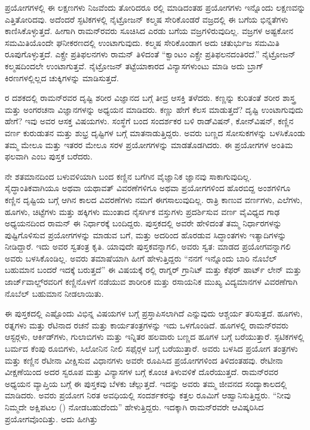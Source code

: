 ಪ್ರಯೋಗಗಳಲ್ಲಿ ಈ ಲಕ್ಷಣಗಳು ನಿಜವೆಂದು ತೋರಿದರೂ ರಲ್ಲಿ ಮಾಡಿದಂತಹ ಪ್ರಯೋಗಗಳು ಇನ್ನೊಂದು ಲಕ್ಷಣವನ್ನು ಎತ್ತಿತೋರಿದವು. ಅದೆಂದರೆ ಸ್ಫಟಿಕಗಳಲ್ಲಿ ನೈಟ್ರೋಜನ್ ಕಲ್ಮಷ ಸೇರಿಕೊಂಡರೆ ವಜ್ರದಲ್ಲಿ ಈ ಬಗೆಯ ಭಿನ್ನತೆಗಳು ಕಾಣಿಸಿಕೊಳ್ಳುತ್ತದೆ. ಹೀಗಾಗಿ ರಾಮನ್‍ರವರು ಸೂಚಿಸಿದ ಎರಡು ಬಗೆಯ ವಜ್ರಗಳಿರುವುದಿಲ್ಲ. ವಜ್ರಗಳ ಅಷ್ಟಕೋನ ಸಮಮಿತಿಯೊಂದೇ ಘನೀಕರಣದಲ್ಲಿ ಉಂಟಾಗುವುದು. ಕಲ್ಮಷ ಸೇರಿಕೊಂಡಾಗ ಅದು ಚತುರ್ಭುಜ ಸಮಮಿತಿ ರೂಪುಗೊಳ್ಳುತ್ತದೆ. ಎಕ್ಸ್\enginline{-}ರೇ ಪ್ರತಿಫಲನಗಳು ರಾಮನ್ ತಿಳಿದಂತೆ “ಕ್ವಾಂಟಂ ಎಕ್ಸ್\enginline{-}ರೇ ಪ್ರತಿಫಲನದಂತಿರದೆ.” ನೈಟ್ರೋಜನ್ ಕಲ್ಮಷದಿಂದಲೇ ಉಂಟಾಗುತ್ತವೆ. ನೈಟ್ರೋಜನ್ ತಟ್ಟೆಯಾಕಾರದ ವಿನ್ಯಾಸಗಳುಂಟು ಮಾಡಿ ಅದು ಬ್ರಾಗ್ ಕಿರಣಗಳಲ್ಲಿಲ್ಲದ ಚುಕ್ಕಿಗಳನ್ನು ಮಾಡಿಸುತ್ತದೆ.



ರ ದಶಕದಲ್ಲಿ ರಾಮನ್‍ರವರ ದೃಷ್ಟಿ ಶರೀರ ವಿಜ್ಞಾನದ ಬಗ್ಗೆ ತೀವ್ರ ಆಸಕ್ತಿ ತಳೆದರು. ಕಣ್ಣನ್ನು ಕುರಿತಂತೆ ಶರೀರ ಶಾಸ್ತ್ರ ಮತ್ತು ಅಂಗರಚನಾ ವಿಜ್ಞಾನಗಳನ್ನು ಅಧ್ಯಯನ ಮಾಡಿದರು. ಕಣ್ಣು ಹೇಗೆ ಕೆಲಸ ಮಾಡುತ್ತದೆ? ದೃಷ್ಟಿ ಉಂಟಾಗುವುದು ಹೇಗೆ? ಇವು ಅವರ ಆಸಕ್ತ ವಿಷಯಗಳು. ಸಂಸ್ಥೆಗೆ ಬಂದ ಸಂದರ್ಶಕರ ಬಳಿ ರಾಡ್‍ವಿಷನ್, ಕೋನ್‍ವಿಷನ್, ಕಣ್ಣಿನ ವರ್ಣ ಕುರುಡುತನ ಮತ್ತು ಶುಭ್ರ ದೃಷ್ಟಿಗಳ ಬಗ್ಗೆ ಮಾತನಾಡುತ್ತಿದ್ದರು. ಅವರು ಬಣ್ಣದ ಸೋಸುಕಗಳನ್ನು ಬಳಸಿಕೊಂಡು ತಮ್ಮ ಮೇಲೂ ಮತ್ತು ಇತರರ ಮೇಲೂ ಸರಳ ಪ್ರಯೋಗಗಳನ್ನು ಮಾಡತೊಡಗಿದರು. ಈ ಪ್ರಯೋಗಗಳ ಅಂತಿಮ ಫಲವಾಗಿ \textit{} ಎಂಬ ಪುಸ್ತಕ ಬರೆದರು.

ನೇ ಶತಮಾನದಿಂದ ಬಳುವಳಿಯಾಗಿ ಬಂದ ಕಣ್ಣಿನ ಬಗೆಗಿನ ವೈಜ್ಞಾನಿಕ ಜ್ಞಾನವು ಸಾಕಾಗುವುದಿಲ್ಲ. ಸೈದ್ಧಾಂತಿಕವಾಗಿಯೂ ಅಥವಾ ಯಥಾವತ್ ವಿವರಣೆಗಳಿಗೂ ಅಥವಾ ಪ್ರಯೋಗಗಳಿಂದ ಹೊರಬಿದ್ದ ಅಂಶಗಳಿಗೂ ಕಣ್ಣಿನ ದೃಷ್ಟಿಯ ಬಗ್ಗೆ ಆಗಿನ ಕಾಲದ ವಿವರಣೆಗಳು ನಮಗೆ ಈಗ\break ಸಾಲುವುದಿಲ್ಲ. ರಾತ್ರಿ ಕಾಣುವ ವರ್ಣಗಳು, ಎಲೆಗಳು, ಹೂಗಳು, ಚಿಟ್ಟೆಗಳು ಮತ್ತು ಹಕ್ಕಿಗಳು ಮುಂತಾದ ನೈಸರ್ಗಿಕ ವಸ್ತುಗಳು ಪ್ರದರ್ಶಿಸುವ ವರ್ಣ ವೈವಿಧ್ಯದ ಗಾಢ ಅಧ್ಯಯನದಿಂದ ರಾಮನ್ ಈ ನಿರ್ಧಾರಕ್ಕೆ ಬಂದಿದ್ದರು. ಪುಸ್ತಕದಲ್ಲಿ ಅವರೇ ಹೇಳಿದಂತೆ ತಮ್ಮ ನಿರ್ಧಾರಗಳನ್ನು ಪುಷ್ಟಿಗೊಳಿಸುವ ಪ್ರಯೋಗಗಳನ್ನು ಮಾಡುವ ಬಗೆ, ಮತ್ತು ಅದರಿಂದ ಹೊರಡುವ ಸಿದ್ಧಾಂತಗಳು ಇತ್ಯಾದಿಗಳನ್ನು ನೀಡಿದ್ದಾರೆ. ಇದು ಅವರ ಸ್ವತಂತ್ರ ಕೃತಿ. ಯಾವುದೇ ಪುಸ್ತಕವನ್ನಾಗಲಿ, ಅವರು ಸ್ವತ: ಮಾಡದ ಪ್ರಯೋಗವನ್ನಾಗಲಿ ಅವರು ಬಳಸಿಕೊಂಡಿಲ್ಲ. ಅವರು ತಮಾಷೆಯಾಗಿ ಹೀಗೆ ಹೇಳುತ್ತಿದ್ದರು \enginline{-} “ನನಗೆ ಇನ್ನೊಂದು ಬಾರಿ ನೊಬೆಲ್ ಬಹುಮಾನ ಬಂದರೆ ಇದಕ್ಕೆ ಬರುತ್ತದೆ” ಈ ವಿಷಯಕ್ಕೆ ರಲ್ಲಿ ರಾಗ್ನರ್ ಗ್ರಾನಿಟ್ ಮತ್ತು ಕೆಫರ್ ಹಾರ್ಟ್ ಲೇನ್ ಮತ್ತು ಜಾರ್ಜ್‌ವಾಲ್ಡ್‌ರವರಿಗೆ ಕಣ್ಣಿನೊಳಗೆ ನಡೆಯುವ ಶಾರೀರಿಕ ಮತ್ತು ರಸಾಯನಿಕ ಮುಖ್ಯ ವಿದ್ಯಮಾನಗಳ ವಿವರಣೆಗಾಗಿ ನೊಬೆಲ್ ಬಹುಮಾನ ನೀಡಲಾಯಿತು.

ಈ ಪುಸ್ತಕದಲ್ಲಿ ಎಷ್ಟೊಂದು ವಿಭಿನ್ನ ವಿಷಯಗಳ ಬಗ್ಗೆ ಪ್ರಸ್ತಾಪಿಸಲಾಗಿದೆ ಎನ್ನುವುದು ಆಶ್ಚರ್ಯ ತರಿಸುತ್ತದೆ. ಹೂಗಳು, ರತ್ನಗಳು ಮತ್ತು ರೆಟಿನಾದ ರಚನೆ ಮತ್ತು ಕಾರ್ಯತಂತ್ರಗಳನ್ನು ಇದು ಒಳಗೊಂಡಿದೆ. ಹೂಗಳಲ್ಲಿ ರಾಮನ್‍ರವರು ಆಸ್ಟರ್‍ಗಳು, ಆರ್ಕಿಡ್‍ಗಳು, ಗುಲಾಬಿಗಳು ಮತ್ತು ಇನ್ನಿತರ ಹಲವಾರು ಬಣ್ಣದ ಹೂಗಳ ಬಗ್ಗೆ ಬರೆಯುತ್ತಾರೆ. ಸ್ಫಟಿಕಗಳಲ್ಲಿ ಬರ್ಮದ ಕೆಂಪು ರೂಬಿಗಳು, ಸಿಲೋನಿನ ನೀಲಿ ಸಫೈರ್‍ಗಳ ಬಗ್ಗೆ ಬರೆಯುತ್ತಾರೆ. ಅವರು ಬಳಸಿದ ಪ್ರಯೋಗ ತಂತ್ರಗಳು ಮತ್ತು ಕಣ್ಣಿನ ರೆಟೀನಾ ವೀಕ್ಷಿಸುವ ವಿಧಾನಗಳು ಅವರೇ ರೂಪಿಸಿದ ಪ್ರಯೋಗಗಳಿಂದ ತಿಳಿದಂತಹವು. ರೇಟೀನಾ ವೀಕ್ಷಣೆಯಿಂದ ಅದರ ಸ್ವರೂಪ ಮತ್ತು ವಿನ್ಯಾಸಗಳ ಬಗ್ಗೆ ಕೊಂಚ ತಿಳುವಳಿಕೆ ದೊರೆಯುತ್ತದೆ. ರಾಮನ್‍ರವರ ಅಧ್ಯಯನ ವ್ಯಾಪ್ತಿಯ ಬಗ್ಗೆ ಈ ಪುಸ್ತಕವು ಬೆಳಕು ಚೆಲ್ಲುತ್ತದೆ. ಇದನ್ನು ಅವರು ತಮ್ಮ ಜೀವನದ ಸಂದ್ಯಾಕಾಲದಲ್ಲಿ ಮಾಡಿದರು. ಅವರು ಪ್ರಯೋಗ ನಿರತ ಅವಧಿಯಲ್ಲಿ ಸಂದರ್ಶಕರನ್ನು ಕತ್ತಲ ರೂಮಿಗೆ ಆಹ್ವಾನಿಸುತ್ತಿದ್ದರು. “ನೀವು ನಿಮ್ಮದೇ ಅಕ್ಷಿಪಟಲ () ನೋಡಬಹುದೆಂದು” ಹೇಳುತ್ತಿದ್ದರು. ಇದಕ್ಕಾಗಿ ರಾಮನ್‍ರವರೇ ಆವಿಷ್ಕರಿಸಿದ ಪ್ರಯೋಗವೊಂದಿತ್ತು. ಅದು ಹೀಗಿತ್ತು \enginline{-}

